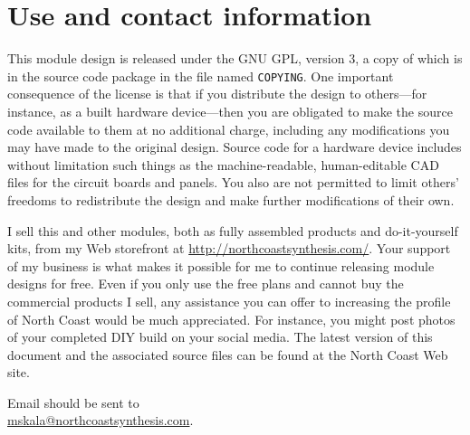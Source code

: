 \section{Use and contact information}

This module design is released under the GNU GPL, version 3, a copy of which
is in the source code package in the file named \texttt{COPYING}.  One
important consequence of the license is that if you distribute the design to
others---for instance, as a built hardware device---then you are obligated
to make the source code available to them at no additional charge, including
any modifications you may have made to the original design.  Source code for
a hardware device includes without limitation such things as the
machine-readable, human-editable CAD files for the circuit boards and
panels.  You also are not permitted to limit others' freedoms to
redistribute the design and make further modifications of their own.

I sell this and other modules, both as fully assembled products and
do-it-yourself kits, from my Web storefront at
\url{http://northcoastsynthesis.com/}.  Your support of my business is what
makes it possible for me to continue releasing module designs for free. 
Even if you only use the free plans and cannot buy the commercial products I
sell, any assistance you can offer to increasing the profile of North Coast
would be much appreciated.  For instance, you might post photos of your
completed DIY build on your social media.  The latest version of this
document and the associated source files can be found at the North Coast Web
site.

Email should be sent to\\ \url{mskala@northcoastsynthesis.com}.
